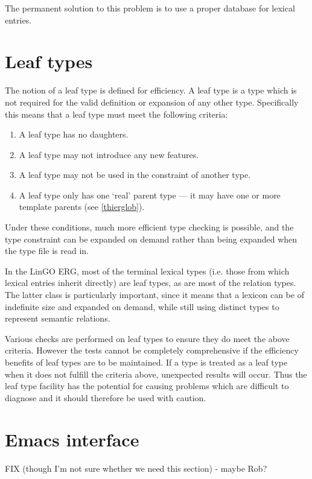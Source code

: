 \documentclass[12pt]{report}
\begin{document}
The permanent solution to this problem is to use a proper database for 
lexical entries.

\section{Leaf types}
\label{leaftypes}

The notion of a leaf type is defined for efficiency.  A leaf type
is a type which is not required for the valid definition or expansion of
any other type.  Specifically this means that a leaf type
must meet the following criteria:
\begin{enumerate}
\item A leaf type has no daughters.
\item A leaf type may not introduce any new features.
\item A leaf type may not be used in the constraint of another type.
\item A leaf type only has one `real' parent type --- it may have one or more
template parents (see \ref{thierglob}).
\end{enumerate}
Under these conditions, much more efficient type checking is possible,
and the type constraint can be expanded on demand rather than being expanded 
when the type file is read in.

In the LinGO ERG, most of the terminal lexical types (i.e. those from 
which lexical entries inherit directly) are leaf types, as are most of
the relation types.  The latter class is particularly important,
since it means that a lexicon can be of indefinite size and expanded on
demand, while still using distinct types to represent semantic relations.

Various checks are performed on leaf types to ensure they do meet
the above criteria.  However the tests cannot be completely comprehensive
if the efficiency benefits of leaf types are to be maintained.
If a type is treated as a leaf type when it does not fulfill the
criteria above, unexpected results will occur.  Thus
the leaf type facility has the potential for causing 
problems which are difficult to diagnose and it should therefore be
used with caution.


\section{Emacs interface}
\label{emacs}

FIX (though I'm not sure whether we need this section) - maybe Rob?
\end{document}
